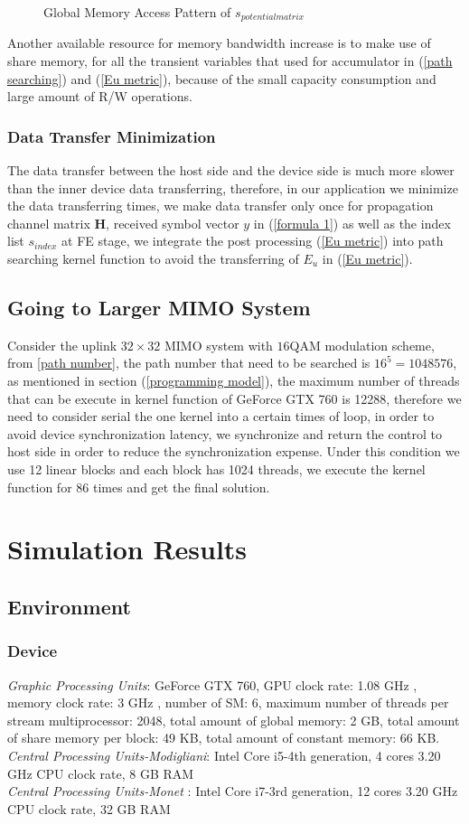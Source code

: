 \documentclass[12pt,a4paper,final]{article}
\begin{document}
\begin{spacing}{2.5}
\begin{figure}[htb]
\caption{Global Memory Access Pattern of $\mathit{s_{potential matrix}}$}
\label{coalesce global memory}
\end{figure}
 Another available resource for memory bandwidth increase is to make use of share memory, for all the transient variables that used for accumulator in (\ref{path searching}) and (\ref{Eu metric}), because of the small capacity consumption and large amount of R/W operations.   
\subsubsection{Data Transfer Minimization}   
The data transfer between the host side and the device side is much more slower than the inner device data transferring, therefore, in our application we minimize the data transferring times, we make data transfer only once for propagation channel matrix $\mathbf{H}$, received symbol vector $y$ in (\ref{formula 1}) as well as the index list $\mathit{s_{index}}$ at FE stage, we integrate the post processing (\ref{Eu metric}) into path searching kernel function to avoid the transferring of $E_{u}$ in (\ref{Eu metric}).  
\subsection{Going to Larger MIMO System}
  Consider the uplink $32\times 32$ MIMO system with $16$QAM modulation scheme, from \ref{path number}, the path number that need to be searched is $16^{5}=1048576$, as mentioned in section (\ref{programming model}), the maximum number of threads that can be execute in kernel function of GeForce GTX 760 is 12288, therefore we need to consider serial the one kernel into a certain times of loop, in order to avoid device synchronization latency, we synchronize and return the control to host side in order to reduce the synchronization expense. Under this condition we use 12 linear blocks and each block has 1024 threads, we execute the kernel function for 86 times and get the final solution.
\section{Simulation Results}
\subsection{Environment}
\subsubsection{Device}
\emph{Graphic Processing Units}: GeForce GTX 760, GPU clock rate: 1.08 GHz , memory clock rate: 3 GHz , number of SM: 6, maximum number of threads per stream multiprocessor: 2048, total amount of global memory: 2 GB, total amount of share memory per block: 49 KB, total amount of constant memory: 66 KB. \\
\emph{Central Processing Units-Modigliani}: Intel Core i5-4th generation, 4 cores 3.20 GHz CPU clock rate, 8 GB RAM\\
\emph{Central Processing Units-Monet} : Intel Core i7-3rd generation, 12 cores 3.20 GHz CPU clock rate, 32 GB RAM\\

\end{spacing}
\end{document}
